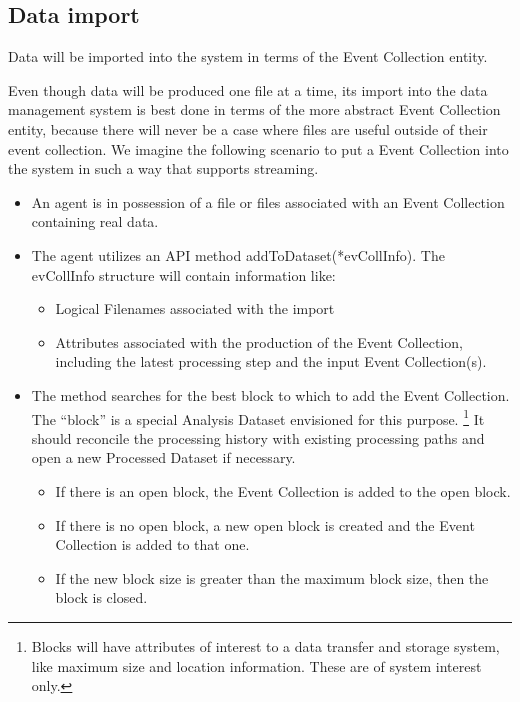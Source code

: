 \documentclass{cmspaper}
\begin{document}
\subsection{Data import}

Data will be imported into the system in terms of the 
Event Collection entity.  

Even though data will be produced one file at a time, its import  
into the data management system is best done in terms of the 
more abstract Event Collection entity, because there will 
never be a case where files are useful outside of their event collection. 
We imagine the following scenario to put  a Event Collection 
into the system in such a way that supports streaming.

\begin{itemize}
\item An agent is in possession of a file or files associated with an
Event Collection containing real data.

\item The agent utilizes an API method addToDataset(*evCollInfo). The 
evCollInfo structure will contain information like: 
\begin{itemize}

\item Logical Filenames associated with the import

\item Attributes associated with the production of the Event Collection, 
including the latest processing step and the input Event Collection(s). 
\end{itemize}

\item The method searches for the best block to which to add the Event 
      Collection. The ``block'' is a special Analysis Dataset envisioned
      for this purpose. \footnote{Blocks will have attributes of
      interest to a data transfer and storage system, like maximum size
      and location information. These are of system interest only.} It
      should reconcile the processing history with existing processing
      paths and open a new Processed Dataset if necessary.

\begin{itemize}

\item If there is an open block, the Event Collection is added to the open 
      block.

\item If there is no open block, a new open block is created and the Event 
      Collection is added to that one.

\item If the new block size is greater than the maximum block size, then 
      the block is closed.  

\end{itemize}

\end{itemize}
\end{document}
